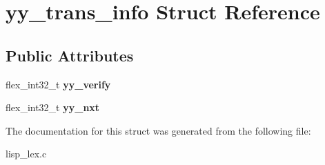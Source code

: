 \hypertarget{structyy__trans__info}{\section{yy\-\_\-trans\-\_\-info Struct Reference}
\label{structyy__trans__info}
}
\subsection*{Public Attributes}
\begin{DoxyCompactItemize}
\item 
\hypertarget{structyy__trans__info_a5c9f61e770deef50bd4e697310342fe9}{flex\-\_\-int32\-\_\-t {\bfseries yy\-\_\-verify}}\label{structyy__trans__info_a5c9f61e770deef50bd4e697310342fe9}

\item 
\hypertarget{structyy__trans__info_ae0715250c2bef261e596e77e0030f13e}{flex\-\_\-int32\-\_\-t {\bfseries yy\-\_\-nxt}}\label{structyy__trans__info_ae0715250c2bef261e596e77e0030f13e}

\end{DoxyCompactItemize}


The documentation for this struct was generated from the following file\-:\begin{DoxyCompactItemize}
\item 
lisp\-\_\-lex.\-c\end{DoxyCompactItemize}

